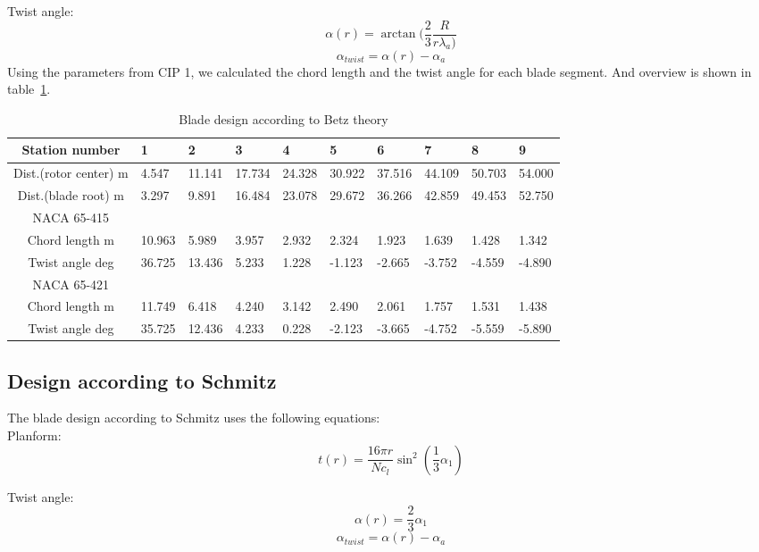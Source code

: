 \documentclass[10pt]{article}
\begin{document}
Twist angle:
\begin{equation}
\alpha(r) = \arctan(\frac{2}{3}\frac{R}{r\lambda_a)}
\end{equation}
\begin{equation}
\alpha_{twist} = \alpha(r) - \alpha_a
\end{equation}
Using the parameters from CIP 1, we calculated the chord length and the twist angle for each blade segment. And overview is shown in table~\ref{blade_design_betz}.
\begin{table}[H]
\begin{tabular}{c| l l l l l l l l l}
\hline
Station number & 	1&	2&	3	&4	&5	&6	&7	&8	&9\\
\hline
Dist.(rotor center)	m&	4.547&	11.141&	17.734&	24.328&	30.922&	37.516&	44.109&	50.703&	54.000\\
Dist.(blade root)	m&	3.297&	9.891&	16.484&	23.078&	29.672&	36.266&	42.859&	49.453&	52.750\\
\hline
NACA 65-415\\
\hline
Chord length	m&		10.963&	5.989&	3.957&	2.932	&2.324&	1.923&	1.639&	1.428&	1.342\\
Twist angle	deg	&	36.725	&13.436&	5.233&	1.228&	-1.123&	-2.665&	-3.752	&-4.559&	-4.890\\
\hline
NACA 65-421\\
\hline
Chord length	m	&	11.749&	6.418	&4.240&	3.142&	2.490&	2.061	&1.757&	1.531&	1.438
\\
Twist angle	deg	&	35.725&	12.436&	4.233&	0.228	&-2.123&	-3.665	&-4.752&	-5.559	&-5.890\\
\hline
\end{tabular}
\caption{Blade design according to Betz theory}
\label{blade_design_betz}
\end{table}
\subsection{Design according to Schmitz}
The blade design according to Schmitz uses the following equations:\\
Planform:
\begin{equation}
t(r) = \frac{16\pi r}{N c_l}\sin^2(\frac{1}{3}\alpha_1)
\end{equation}

Twist angle:
\begin{equation}
\alpha(r) = \frac{2}{3}\alpha_1
\end{equation}
\begin{equation}
\alpha_{twist} = \alpha(r) - \alpha_a
\end{equation}
\end{document}
